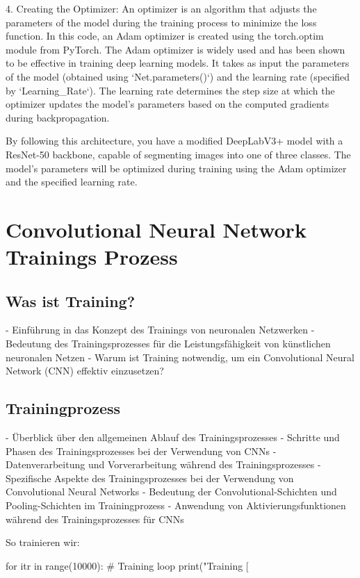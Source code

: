 4. Creating the Optimizer:
An optimizer is an algorithm that adjusts the parameters of the model during the training process to minimize the loss function. In this code, an Adam optimizer is created using the torch.optim module from PyTorch. The Adam optimizer is widely used and has been shown to be effective in training deep learning models. It takes as input the parameters of the model (obtained using `Net.parameters()`) and the learning rate (specified by `Learning_Rate`). The learning rate determines the step size at which the optimizer updates the model's parameters based on the computed gradients during backpropagation.

By following this architecture, you have a modified DeepLabV3+ model with a ResNet-50 backbone, capable of segmenting images into one of three classes. The model's parameters will be optimized during training using the Adam optimizer and the specified learning rate.



\chapter{Convolutional Neural Network Trainings Prozess}

\section{Was ist Training?}
- Einführung in das Konzept des Trainings von neuronalen Netzwerken
- Bedeutung des Trainingsprozesses für die Leistungsfähigkeit von künstlichen neuronalen Netzen
- Warum ist Training notwendig, um ein Convolutional Neural Network (CNN) effektiv einzusetzen?

\section{Trainingprozess}
- Überblick über den allgemeinen Ablauf des Trainingsprozesses
- Schritte und Phasen des Trainingsprozesses bei der Verwendung von CNNs
- Datenverarbeitung und Vorverarbeitung während des Trainingsprozesses
- Spezifische Aspekte des Trainingsprozesses bei der Verwendung von Convolutional Neural Networks
- Bedeutung der Convolutional-Schichten und Pooling-Schichten im Trainingprozess
- Anwendung von Aktivierungsfunktionen während des Trainingsprozesses für CNNs


So trainieren wir:

for itr in range(10000):  # Training loop
    print("Training [%

